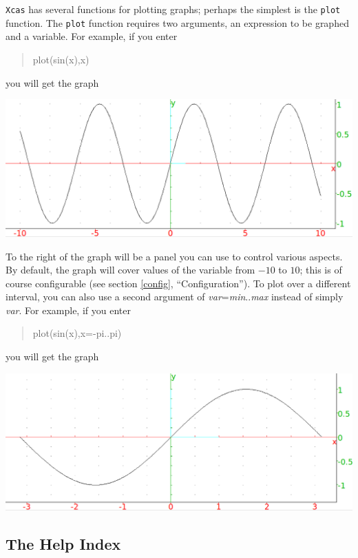 \documentclass{article}
\newcommand{\xcasin}[1]
{\begin{quote}\ttfamily
#1
\end{quote}}
\begin{document}
\texttt{Xcas} has several functions for plotting graphs; perhaps the
simplest is the \texttt{plot} function.  The \texttt{plot} function
requires two arguments, an expression to be graphed and a variable.
For example, if you enter
\xcasin{plot(sin(x),x)}
you will get the graph
\begin{center}
\includegraphics[width=\textwidth]{xcas-sinplot.png}
\end{center}
To the right of the graph will be a panel you can use to control
various aspects.  By default, the graph will cover values of the
variable from $-10$ to $10$; this is of course configurable (see
section \ref{config}, ``Configuration'').  To plot
over a different interval, you can also use a second argument of 
\textit{var}=\textit{min}..\textit{max} instead of simply
\textit{var}.  For example, if you enter
\xcasin{plot(sin(x),x=-pi..pi)}
you will get the graph
\begin{center}
\includegraphics[width=\textwidth]{xcas-sinplot2.png}
\end{center}

\subsection{The Help Index}
\end{document}

